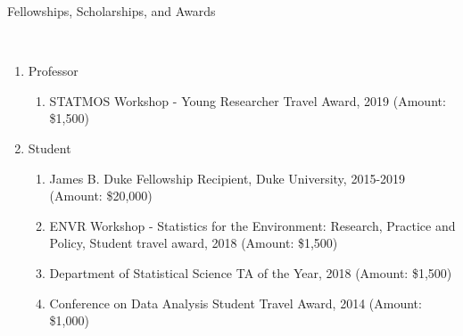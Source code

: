 \documentclass[11pt]{article}
\newcommand{\head}[1]{ %
    \bigskip %
    \begin{large}\begin{bf}{#1}\end{bf}\end{large} %

    \ \\ [-1.3cm] %

    \hrulefill}
\begin{document}
\head{Fellowships, Scholarships, and Awards}
\begin{enumerate}[label=$\bullet$]

\item Professor
\begin{enumerate}[label=$\cdot$]
\item STATMOS Workshop - Young Researcher Travel Award, 2019  (Amount: \$1,500)
\end{enumerate}
\item Student
\begin{enumerate}[label=$\cdot$]
\item James B. Duke Fellowship Recipient, Duke University, 2015-2019 (Amount: \$20,000)
\item ENVR Workshop - Statistics for the Environment: Research, Practice and Policy, Student travel award, 2018 (Amount: \$1,500)
\item Department of Statistical Science TA of the Year, 2018 (Amount: \$1,500)
\item Conference on Data Analysis Student Travel Award, 2014 (Amount: \$1,000)
\end{enumerate}

\end{enumerate}
\end{document}
